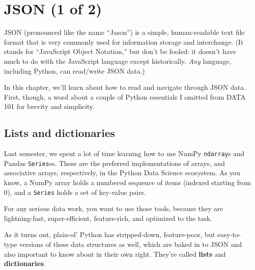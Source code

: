 

\chapter{JSON (1 of 2)}
\label{ch:JSON1}

JSON (pronounced like the name ``Jason'') is a simple, human-readable text file
format that is very commonly used for information storage and interchange. (It
stands for ``JavaScript Object Notation,'' but don't be fooled: it doesn't have
much to do with the JavaScript language except historically. \textit{Any}
language, including Python, can read/write JSON data.)

In this chapter, we'll learn about how to read and navigate through JSON data.
First, though, a word about a couple of Python essentials I omitted from DATA
101 for brevity and simplicity.

\section{Lists and dictionaries}


Last semester, we spent a lot of time learning how to use NumPy
\texttt{ndarray}s and Pandas \texttt{Series}es. These are the preferred
implementations of arrays, and associative arrays, respectively, in the Python
Data Science ecosystem. As you know, a NumPy array holds a numbered sequence of
items (indexed starting from 0), and a \texttt{Series} holds a set of key-value
pairs.

For any serious data work, you want to use those tools, because they are
lightning-fast, super-efficient, feature-rich, and optimized to the task.


As it turns out, plain-ol' Python has stripped-down, feature-poor, but
easy-to-type versions of these data structures as well, which are baked in to
JSON and also important to know about in their own right. They're called
\textbf{lists} and \textbf{dictionaries}.

